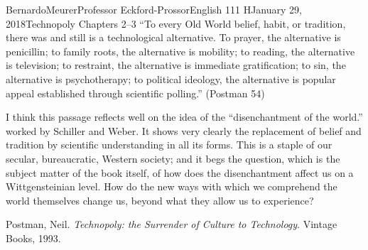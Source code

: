 \documentclass[12pt,letterpaper]{article}
\begin{document}
\begin{mla}{Bernardo}{Meurer}{Professor Eckford-Prossor}{English 111 H}{January 29, 2018}{Technopoly Chapters 2--3}
    ``To every Old World belief, habit, or tradition, there was and still is a technological alternative.  To prayer, the alternative is penicillin; to family roots, the alternative is mobility; to reading, the alternative is television; to restraint, the alternative is immediate gratification; to sin, the alternative is psychotherapy; to political ideology, the alternative is popular appeal established through scientific polling.'' (Postman 54)
    \vspace{10pt}


    I think this passage reflects well on the idea of the ``disenchantment of the world.'' worked by Schiller and Weber. It shows very clearly the replacement of belief and tradition by scientific understanding in all its forms. This is a staple of our secular, bureaucratic, Western society; and it begs the question, which is the subject matter of the book itself, of how does the disenchantment affect us on a Wittgensteinian level. How do the new ways with which we comprehend the world themselves change us, beyond what they allow us to experience?

    \begin{workscited}
        \bibent  Postman, Neil. \emph{Technopoly: the Surrender of Culture to Technology}. Vintage Books, 1993.
    \end{workscited}
\end{mla}
\end{document}

